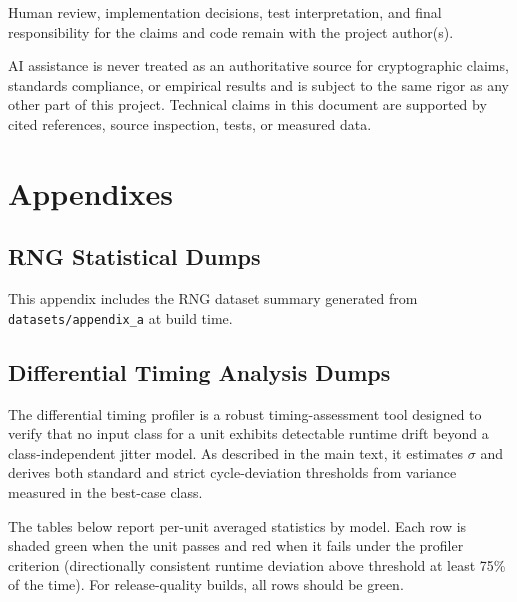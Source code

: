 \documentclass[titlepage]{report}
\renewcommand{\thesection}{\arabic{section}}
\renewcommand{\thesubsection}{\thesection.\arabic{subsection}}
\begin{document}
	Human review, implementation decisions, test interpretation, and final responsibility for the claims and code remain with the project author(s).

	AI assistance is never treated as an authoritative source for cryptographic claims, standards compliance, or empirical results and is subject to the same rigor as any other part of this project. Technical claims in this document are supported by cited references, source inspection, tests, or measured data.

	
	\newpage
	\section{Appendixes}
	\setcounter{subsection}{0}
	\renewcommand{\thesubsection}{\Alph{subsection}}
	
	\subsection{RNG Statistical Dumps}
	This appendix includes the RNG dataset summary generated from \texttt{datasets/appendix\_a} at build time.
	
	
	\newpage
	\subsection{Differential Timing Analysis Dumps}
	
	The differential timing profiler is a robust timing-assessment tool designed to verify that no input class for a unit exhibits detectable runtime drift beyond a class-independent jitter model. As described in the main text, it estimates $\sigma$ and derives both standard and strict cycle-deviation thresholds from variance measured in the best-case class.
	
	The tables below report per-unit averaged statistics by model. Each row is shaded green when the unit passes and red when it fails under the profiler criterion (directionally consistent runtime deviation above threshold at least 75\% of the time). For release-quality builds, all rows should be green.

	
\end{document}
